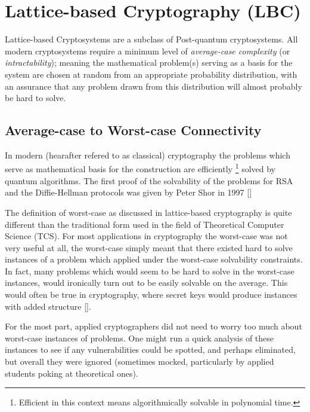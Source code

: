 \section{Lattice-based Cryptography (LBC)} 

Lattice-based Cryptosystems are a subclass of Post-quantum cryptosystems. All modern cryptosystems require a minimum level of \emph{average-case complexity} (or \emph{intractability}); meaning the mathematical problem(s) serving as a basis for the system are chosen at random from an appropriate probability distribution, with an assurance that any problem drawn from this distribution will almost probably  be hard to solve. 




 

\subsection{Average-case to Worst-case Connectivity}

In modern (hearafter refered to as classical) cryptography the problems which serve as mathematical basis for the construction are efficiently \footnote{Efficient in this context means algorithmically solvable in polynomial time.} solved by quantum algorithms. The first proof of the solvability of the problems for RSA and the Diffie-Hellman protocols was given by Peter Shor in 1997 [\cite{Sho19970}] 

The definition of worst-case as discussed in lattice-based cryptography is quite different than the traditional form used in the field of Theoretical Computer Science (TCS). For most applications in cryptography the worst-case was not very useful at all, the worst-case simply meant that there existed hard to solve instances of a problem which applied under the worst-case solvability constraints. In fact, many problems which would seem to be hard to solve in the worst-case instances, would ironically turn out to be easily solvable on the average. This would often be true in cryptography, where secret keys would produce instances with added structure [\cite{Pei20151}].  


For the most part, applied cryptographers did not need to worry too much about worst-case instances of problems. One might run a quick analysis of these instances to see if any vulnerabilities could be spotted, and perhaps eliminated, but overall they were ignored (sometimes mocked, particularly by applied students poking at theoretical ones). 
